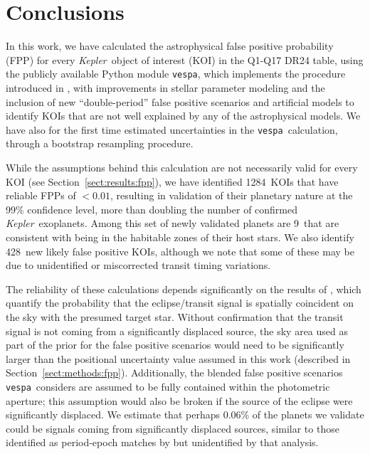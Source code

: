 \documentclass{emulateapj}
\newcommand{\sectionname}{Section}
\newcommand{\Sect}[1]{\sectionname~\ref{sect:#1}}
\newcommand{\sect}[1]{\Sect{#1}}
\newcommand{\sectlabel}[1]{\label{sect:#1}}
\newcommand{\nvalnew}{1284} %
\newcommand{\nfpnew}{428}  %
\newcommand{\nhz}{9}
\newcommand{\kepler}{\textit{Kepler}}
\newcommand{\vespa}{\texttt{vespa}}
\begin{document}



\section{Conclusions}
\sectlabel{conclusions}

In this work, we have calculated the astrophysical false positive
probability (FPP) for every \kepler\ object of interest (KOI) in the
Q1-Q17 DR24 table, using the publicly available Python module
\vespa, which implements the procedure introduced in
\citet{Morton:2012}, with improvements in stellar parameter modeling
and the inclusion of new ``double-period'' false positive scenarios 
and artificial models to identify KOIs that are not well explained
by any of the astrophysical models.  We have also for the first time
estimated uncertainties in the \vespa\ calculation, through a bootstrap
resampling procedure.

While the assumptions behind this calculation are not necessarily
valid for every KOI (see \sect{results:fpp}), we have identified
\nvalnew\ KOIs that have reliable FPPs of $< 0.01$, resulting in
validation of their planetary nature at the 99\% confidence level,
more than doubling the number of confirmed \kepler\ exoplanets.  Among
this set of newly validated planets are \nhz\ that are consistent with being
in the habitable zones of their host stars.  We also identify \nfpnew\ new likely
false positive KOIs, although we note that some of these may be due to
unidentified or miscorrected transit timing variations.  

The reliability of these calculations depends significantly on the
results of \citet{Bryson:KSCI}, which quantify the probability that
the eclipse/transit signal is spatially coincident on the sky with the
presumed target star.  Without confirmation that the transit signal is
not coming from a significantly displaced source, the sky area used as
part of the prior for the false positive scenarios would need to be
significantly larger than the positional uncertainty value assumed in
this work (described in \sect{methods:fpp}).  Additionally, the
blended false positive scenarios \vespa\ considers are assumed to be
fully contained within the photometric aperture; this assumption would
also be broken if the source of the eclipse were significantly
displaced.  We estimate that perhaps 0.06\% of the planets we validate
could be signals coming from significantly displaced sources, similar 
to those identified as period-epoch matches by \citet{Coughlin:2014}
but unidentified by that analysis.
\end{document}

